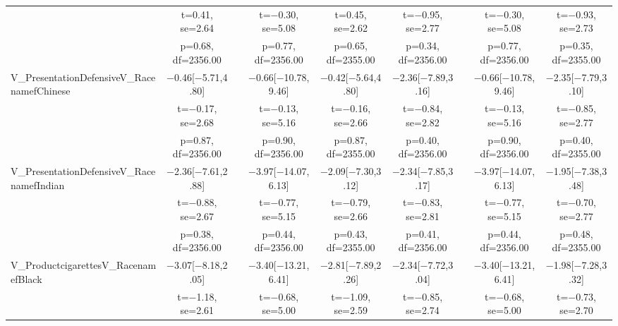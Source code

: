 \documentclass[]{report}
\begin{document}
\begin{table}
{\begin{tabular}[t]{lcccccccc}
		& t=\num{0.41}, se=\num{2.64} &  & t=\num{-0.30}, se=\num{5.08} & t=\num{0.45}, se=\num{2.62} & t=\num{-0.95}, se=\num{2.77} &  & t=\num{-0.30}, se=\num{5.08} & t=\num{-0.93}, se=\num{2.73}\\
		& p=\num{0.68}, df=\num{2356.00} &  & p=\num{0.77}, df=\num{2356.00} & p=\num{0.65}, df=\num{2355.00} & p=\num{0.34}, df=\num{2356.00} &  & p=\num{0.77}, df=\num{2356.00} & p=\num{0.35}, df=\num{2355.00}\\
		V\_PresentationDefensiveV\_RacenamefChinese & \num{-0.46}[\num{-5.71},\num{4.80}] &  & \num{-0.66}[\num{-10.78},\num{9.46}] & \num{-0.42}[\num{-5.64},\num{4.80}] & \num{-2.36}[\num{-7.89},\num{3.16}] &  & \num{-0.66}[\num{-10.78},\num{9.46}] & \num{-2.35}[\num{-7.79},\num{3.10}]\\
		& t=\num{-0.17}, se=\num{2.68} &  & t=\num{-0.13}, se=\num{5.16} & t=\num{-0.16}, se=\num{2.66} & t=\num{-0.84}, se=\num{2.82} &  & t=\num{-0.13}, se=\num{5.16} & t=\num{-0.85}, se=\num{2.77}\\
		& p=\num{0.87}, df=\num{2356.00} &  & p=\num{0.90}, df=\num{2356.00} & p=\num{0.87}, df=\num{2355.00} & p=\num{0.40}, df=\num{2356.00} &  & p=\num{0.90}, df=\num{2356.00} & p=\num{0.40}, df=\num{2355.00}\\
		V\_PresentationDefensiveV\_RacenamefIndian & \num{-2.36}[\num{-7.61},\num{2.88}] &  & \num{-3.97}[\num{-14.07},\num{6.13}] & \num{-2.09}[\num{-7.30},\num{3.12}] & \num{-2.34}[\num{-7.85},\num{3.17}] &  & \num{-3.97}[\num{-14.07},\num{6.13}] & \num{-1.95}[\num{-7.38},\num{3.48}]\\
		& t=\num{-0.88}, se=\num{2.67} &  & t=\num{-0.77}, se=\num{5.15} & t=\num{-0.79}, se=\num{2.66} & t=\num{-0.83}, se=\num{2.81} &  & t=\num{-0.77}, se=\num{5.15} & t=\num{-0.70}, se=\num{2.77}\\
		& p=\num{0.38}, df=\num{2356.00} &  & p=\num{0.44}, df=\num{2356.00} & p=\num{0.43}, df=\num{2355.00} & p=\num{0.41}, df=\num{2356.00} &  & p=\num{0.44}, df=\num{2356.00} & p=\num{0.48}, df=\num{2355.00}\\
		V\_ProductcigarettesV\_RacenamefBlack & \num{-3.07}[\num{-8.18},\num{2.05}] &  & \num{-3.40}[\num{-13.21},\num{6.41}] & \num{-2.81}[\num{-7.89},\num{2.26}] & \num{-2.34}[\num{-7.72},\num{3.04}] &  & \num{-3.40}[\num{-13.21},\num{6.41}] & \num{-1.98}[\num{-7.28},\num{3.32}]\\
		& t=\num{-1.18}, se=\num{2.61} &  & t=\num{-0.68}, se=\num{5.00} & t=\num{-1.09}, se=\num{2.59} & t=\num{-0.85}, se=\num{2.74} &  & t=\num{-0.68}, se=\num{5.00} & t=\num{-0.73}, se=\num{2.70}\\

\end{tabular}}
\end{table}
\end{document}

